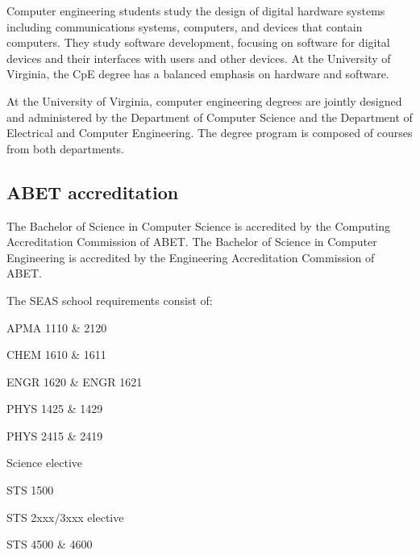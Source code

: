 Computer engineering students study the design of digital hardware
systems including communications systems, computers, and devices that
contain computers. They study software development, focusing on
software for digital devices and their interfaces with users and other
devices. At the University of Virginia, the CpE degree has a balanced
emphasis on hardware and software.

At the University of Virginia, computer engineering degrees are
jointly designed and administered by the Department of Computer
Science and the Department of Electrical and Computer Engineering. The
degree program is composed of courses from both departments. 

\subsection{ABET accreditation}

The Bachelor of Science in Computer Science is accredited by the
Computing Accreditation Commission of
ABET.  The Bachelor of
Science in Computer Engineering is accredited by the Engineering
Accreditation Commission of ABET.




\begin{figure}[h!]
\label{fig:coursereqscomparison}
\begin{center}
\end{center}
\end{figure}

The SEAS school requirements consist of:
\begin{itemlist}
\item APMA 1110 \& 2120
\item CHEM 1610 \& 1611
\item ENGR 1620 \& ENGR 1621
\item PHYS 1425 \& 1429
\item PHYS 2415 \& 2419
\item Science elective
\item STS 1500
\item STS 2xxx/3xxx elective
\item STS 4500 \& 4600
\end{itemlist}

